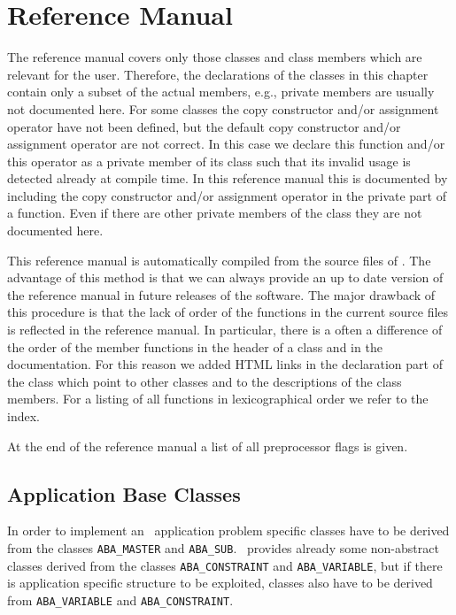 
\chapter{Reference Manual}
\label{chapter:ReferenceManual}

The reference manual covers only those classes and class members which
are relevant for the user. Therefore, the declarations of the classes
in this chapter contain only a subset of the actual members, e.g., 
private members are usually not documented here. For some classes
the copy constructor and/or assignment operator have not been defined,
but the default copy constructor and/or assignment operator are not
correct. In this case we declare this function and/or this operator
as a private member of its class such that its invalid usage is
detected already at compile time. In this reference manual this
is documented by including the copy constructor and/or assignment
operator in the private part of a function. Even if there are other
private members of the class they are not documented here.

This reference manual is automatically compiled from the source files
of \ABACUS. The advantage of this method is that we can always provide
an up to date version of the reference manual in future releases of
the software. The major drawback of this procedure is that the lack
of order of the functions in the current source files is reflected in
the reference manual. In particular, there is a often a difference of the
order of the member functions in the header of a class and in the 
documentation. For this reason we added HTML  links in
the declaration part of the class which point to other classes
and to the descriptions of the class members.
For a listing of all functions in lexicographical
order we refer to  the index.


At the end of the reference manual a list of all preprocessor flags is
given.

\section{Application Base Classes}

In order to implement an \ABACUS\ application problem specific classes
have to be derived from the classes {\tt ABA\_MASTER} and {\tt ABA\_SUB}. 
\ABACUS\ provides already some non-abstract classes derived from the
classes {\tt ABA\_CONSTRAINT} and {\tt ABA\_VARIABLE}, but if there is 
application specific structure to be exploited, classes also have 
to be derived from {\tt ABA\_VARIABLE} and {\tt ABA\_CONSTRAINT}.

